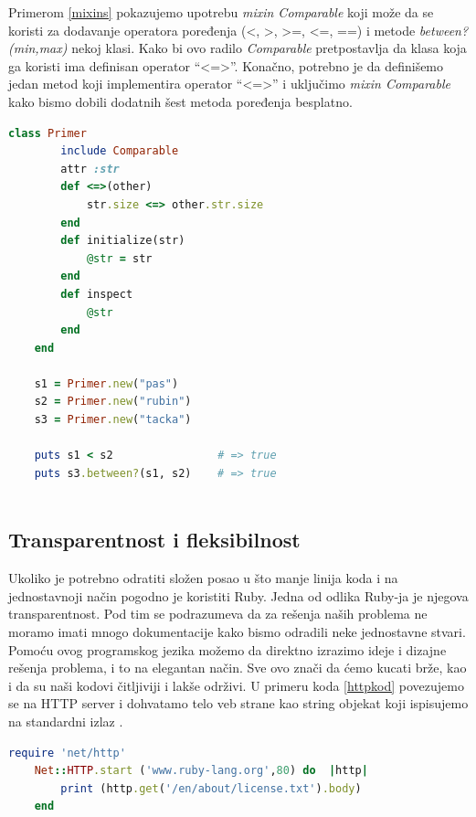 \documentclass[a4paper]{article}
\begin{document}
Primerom \ref{mixins} pokazujemo upotrebu \emph{mixin Comparable} koji može da se koristi za dodavanje operatora poređenja (\textless , \textgreater , \textgreater =, \textless =, ==) i metode \emph{between?(min,max)} nekoj klasi. Kako bi ovo radilo \emph{Comparable} pretpostavlja da klasa koja ga koristi ima definisan operator  “\textless =\textgreater”. Konačno, potrebno je da definišemo jedan metod koji implementira operator “\textless =\textgreater” i uključimo \emph{mixin Comparable} kako bismo dobili dodatnih šest metoda poređenja besplatno.
\begin{lstlisting}[language=Ruby, caption={Primer koda}, frame=single, label=mixins]
	class Primer
		include Comparable
		attr :str
		def <=>(other)
			str.size <=> other.str.size
		end
		def initialize(str)
			@str = str
		end
		def inspect
			@str
		end
	end
	
	s1 = Primer.new("pas")
	s2 = Primer.new("rubin")
	s3 = Primer.new("tacka")
	
	puts s1 < s2 				# => true
	puts s3.between?(s1, s2)	# => true
	
\end{lstlisting}\vspace*{-15pt}

\subsection{Transparentnost i fleksibilnost}
Ukoliko je potrebno odratiti složen posao u što manje linija koda i na jednostavnoji način pogodno je koristiti Ruby. %
Jedna od odlika Ruby-ja je njegova transparentnost. Pod tim se podrazumeva da za rešenja naših problema ne moramo imati mnogo dokumentacije kako bismo odradili neke jednostavne stvari. Pomoću ovog programskog jezika možemo da direktno izrazimo ideje i dizajne rešenja problema, i to na elegantan način. Sve ovo znači da ćemo kucati brže, kao i da su naši kodovi čitljiviji i lakše održivi. U primeru koda \ref{httpkod} povezujemo se na HTTP server i dohvatamo telo veb strane kao string objekat koji ispisujemo na standardni izlaz \cite{poignant}.
\begin{lstlisting}[language=Ruby, caption = "Primer koda", label=httpkod]
	require 'net/http'
	Net::HTTP.start ('www.ruby-lang.org',80) do  |http|
		print (http.get('/en/about/license.txt').body)
	end
\end{lstlisting}\vspace*{-15pt}
\end{document}
